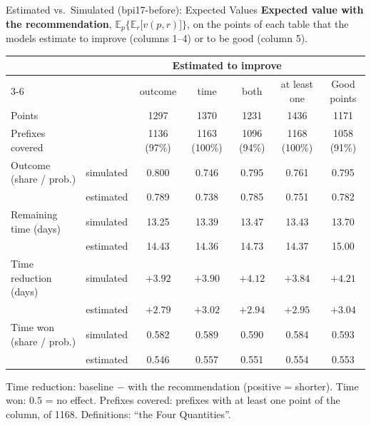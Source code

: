 \documentclass[aspectratio=169]{beamer} %
\begin{document}
\begin{frame}{Estimated vs.\ Simulated (bpi17-before): Expected Values}
  \scriptsize\setlength{\aboverulesep}{0pt}\setlength{\belowrulesep}{1pt}
  \textbf{Expected value with the recommendation}, $\mathbb{E}_p\big\{\mathbb{E}_r\big[v(p,r)\big]\big\}$,
  on the points of each table that the models estimate to improve (columns 1--4) or to be good (column 5).
  \begin{center}\setlength{\tabcolsep}{3pt}
  \begin{tabular}{ll ccccc}
    \toprule
     & & \multicolumn{4}{c}{Estimated to improve} & \\
    \cmidrule(lr){3-6}
     & & outcome & time & both & at least one & Good points \\
    \midrule
    Points & & 1297 & 1370 & 1231 & 1436 & 1171 \\
    Prefixes covered & & 1136 (97\%) & 1163 (100\%) & 1096 (94\%) & 1168 (100\%) & 1058 (91\%) \\
    \midrule
    Outcome (share / prob.) & simulated & 0.800 & 0.746 & 0.795 & 0.761 & 0.795 \\
     & estimated & 0.789 & 0.738 & 0.785 & 0.751 & 0.782 \\
    \addlinespace[2pt]
    Remaining time (days) & simulated & 13.25 & 13.39 & 13.47 & 13.43 & 13.70 \\
     & estimated & 14.43 & 14.36 & 14.73 & 14.37 & 15.00 \\
    \addlinespace[2pt]
    Time reduction (days) & simulated & $+3.92$ & $+3.90$ & $+4.12$ & $+3.84$ & $+4.21$ \\
     & estimated & $+2.79$ & $+3.02$ & $+2.94$ & $+2.95$ & $+3.04$ \\
    \addlinespace[2pt]
    Time won (share / prob.) & simulated & 0.582 & 0.589 & 0.590 & 0.584 & 0.593 \\
     & estimated & 0.546 & 0.557 & 0.551 & 0.554 & 0.553 \\
    \bottomrule
  \end{tabular}
  \end{center}
  {\tiny Time reduction: baseline $-$ with the recommendation (positive = shorter). Time won: $0.5$ = no effect.
  Prefixes covered: prefixes with at least one point of the column, of 1168. Definitions: ``the Four Quantities''.}
\end{frame}
\end{document}

